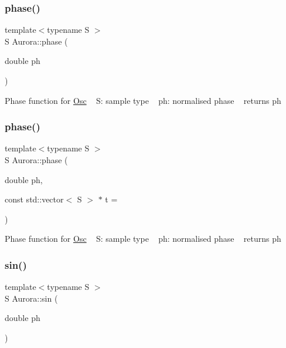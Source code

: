 \mbox{\label{namespace_aurora_a2fab91108d29c7101741bcd2ebe1ba72}} 
\subsubsection{\texorpdfstring{phase()}{phase()}\hspace{0.1cm}{\footnotesize\ttfamily [1/2]}}
{\footnotesize\ttfamily template$<$typename S $>$ \\
S Aurora\+::phase (\begin{DoxyParamCaption}\item[{double}]{ph }\end{DoxyParamCaption})}

Phase function for \hyperlink{class_aurora_1_1_osc}{Osc} ~\newline
S\+: sample type ~\newline
ph\+: normalised phase ~\newline
returns ph \mbox{\label{namespace_aurora_a6a6af5d9695d0ec8fcb343c456c1faab}} 
\subsubsection{\texorpdfstring{phase()}{phase()}\hspace{0.1cm}{\footnotesize\ttfamily [2/2]}}
{\footnotesize\ttfamily template$<$typename S $>$ \\
S Aurora\+::phase (\begin{DoxyParamCaption}\item[{double}]{ph,  }\item[{const std\+::vector$<$ S $>$ $\ast$}]{t = {} }\end{DoxyParamCaption})\hspace{0.3cm}{\ttfamily [inline]}}

Phase function for \hyperlink{class_aurora_1_1_osc}{Osc} ~\newline
S\+: sample type ~\newline
ph\+: normalised phase ~\newline
returns ph \mbox{\label{namespace_aurora_a388ea5736944d8887f5586afd45a03b8}} 
\subsubsection{\texorpdfstring{sin()}{sin()}\hspace{0.1cm}{\footnotesize\ttfamily [1/2]}}
{\footnotesize\ttfamily template$<$typename S $>$ \\
S Aurora\+::sin (\begin{DoxyParamCaption}\item[{double}]{ph }\end{DoxyParamCaption})}

